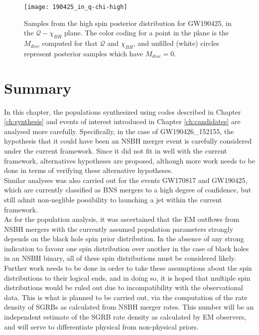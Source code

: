         \begin{figure}[ht]
            \centering
            \texttt{[image: 190425\_in\_q-chi-high]}
            \caption[$M_{disc}$ for GW190425's High Spin Posterior Distribution]
            {
                Samples from the high spin posterior distribution for GW190425, in the
                $\mathcal{Q}-\chi_{BH}$ plane. The color coding for a point in the plane
                is the $M_{disc}$ computed for that $\mathcal{Q}$ and $\chi_{BH}$, and
                unfilled (white) circles represent posterior samples which have
                $M_{disc} = 0$.
            }
            \label{fig:190425_high}
        \end{figure}

\section{Summary}

    In this chapter, the populations synthesized using codes described in Chapter
    \ref{ch:synthesis} and events of interest introduced in Chapter \ref{ch:candidates}
    are analysed more carefully. Specifically, in the case of GW190426\_152155, the
    hypothesis that it could have been an NSBH merger event is carefully considered
    under the current framework. Since it did not fit in well with the current
    framework, alternatives hypotheses are proposed, although more work needs to be done
    in terms of verifying these alternative hypotheses.\\
    Similar analyses was also carried out for the events GW170817 and GW190425, which
    are currently classified as BNS mergers to a high degree of confidence, but still
    admit non-neglible possibility to launching a jet within the current framework.\\
    As for the population analysis, it was ascertained that the EM outflows from NSBH
    mergers with the currently assumed population parameters strongly depends on the
    black hole spin prior distribution. In the absence of any strong indication to
    favour one spin distribution over another in the case of black holes in an NSBH
    binary, all of these spin distributions must be considered likely. Further work
    needs to be done in order to take these assumptions about the spin distributions to
    their logical ends, and in doing so, it is hoped that multiple spin distributions
    would be ruled out due to incompatibility with the observational data. This is what
    is planned to be carried out, via the computation of the rate density of SGRBs as
    calculated from NSBH merger rates. This number will be an independent estimate of
    the SGRB rate density as calculated by EM observers, and will serve to differentiate
    physical from non-physical priors.

